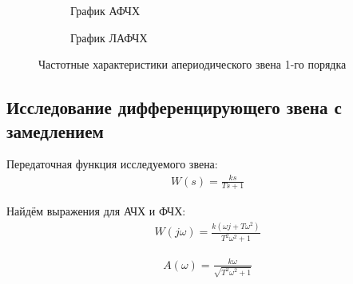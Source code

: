 \documentclass[a4paper, 11pt]{article}
\begin{document}
\begin{figure}[h!]
    \begin{subfigure}{0.5\textwidth}
        \centering
        \caption{График АФЧХ}
    \end{subfigure}
    \begin{subfigure}{0.5\textwidth}
        \centering
        \caption{График ЛАФЧХ}
    \end{subfigure}
    \caption{Частотные характеристики апериодического звена 1-го порядка}
\end{figure}

\newpage
\begin{center}
	\section{Исследование дифференцирующего звена с замедлением}
\end{center}

\par 
Передаточная функция исследуемого звена:
\begin{align}
	W(s)=\frac{ks}{Ts+1}
\end{align}
\par 
Найдём выражения для АЧХ и ФЧХ:
\begin{align}
	W(j\omega)=\displaystyle \frac{k(\omega j+T\omega^2)}{T^2\omega^2+1}
\end{align}

\begin{align}
	A(\omega)=\frac{k\omega}{\sqrt{T^2\omega^2+1}}
\end{align}
\end{document}
